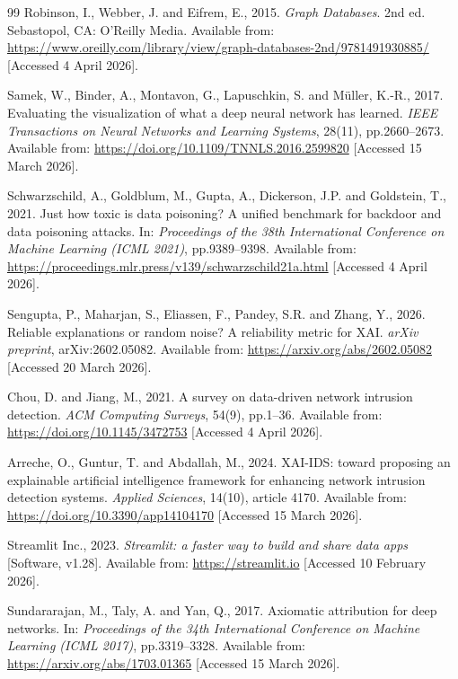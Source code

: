 \documentclass[12pt,a4paper]{report}
\begin{document}
\begin{thebibliography}{99}
Robinson, I., Webber, J. and Eifrem, E., 2015. \textit{Graph Databases}. 2nd ed. Sebastopol, CA: O'Reilly Media. Available from: \url{https://www.oreilly.com/library/view/graph-databases-2nd/9781491930885/} [Accessed 4 April 2026].

Samek, W., Binder, A., Montavon, G., Lapuschkin, S. and M\"{u}ller, K.-R., 2017. Evaluating the visualization of what a deep neural network has learned. \textit{IEEE Transactions on Neural Networks and Learning Systems}, 28(11), pp.2660--2673. Available from: \url{https://doi.org/10.1109/TNNLS.2016.2599820} [Accessed 15 March 2026].

Schwarzschild, A., Goldblum, M., Gupta, A., Dickerson, J.P. and Goldstein, T., 2021. Just how toxic is data poisoning? A unified benchmark for backdoor and data poisoning attacks. In: \textit{Proceedings of the 38th International Conference on Machine Learning (ICML 2021)}, pp.9389--9398. Available from: \url{https://proceedings.mlr.press/v139/schwarzschild21a.html} [Accessed 4 April 2026].

Sengupta, P., Maharjan, S., Eliassen, F., Pandey, S.R. and Zhang, Y., 2026. Reliable explanations or random noise? A reliability metric for XAI. \textit{arXiv preprint}, arXiv:2602.05082. Available from: \url{https://arxiv.org/abs/2602.05082} [Accessed 20 March 2026].

Chou, D. and Jiang, M., 2021. A survey on data-driven network intrusion detection. \textit{ACM Computing Surveys}, 54(9), pp.1--36. Available from: \url{https://doi.org/10.1145/3472753} [Accessed 4 April 2026].

Arreche, O., Guntur, T. and Abdallah, M., 2024. XAI-IDS: toward proposing an explainable artificial intelligence framework for enhancing network intrusion detection systems. \textit{Applied Sciences}, 14(10), article 4170. Available from: \url{https://doi.org/10.3390/app14104170} [Accessed 15 March 2026].

Streamlit Inc., 2023. \textit{Streamlit: a faster way to build and share data apps} [Software, v1.28]. Available from: \url{https://streamlit.io} [Accessed 10 February 2026].

Sundararajan, M., Taly, A. and Yan, Q., 2017. Axiomatic attribution for deep networks. In: \textit{Proceedings of the 34th International Conference on Machine Learning (ICML 2017)}, pp.3319--3328. Available from: \url{https://arxiv.org/abs/1703.01365} [Accessed 15 March 2026].


\end{thebibliography}
\end{document}
